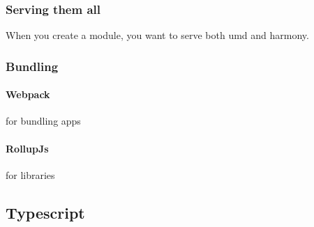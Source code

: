 \subsubsection{Serving them all}
When you create a module, you want to serve both umd and harmony.

\subsubsection{Bundling}

\paragraph{Webpack} for bundling apps

\paragraph{RollupJs} for libraries


\subsection{Typescript}
